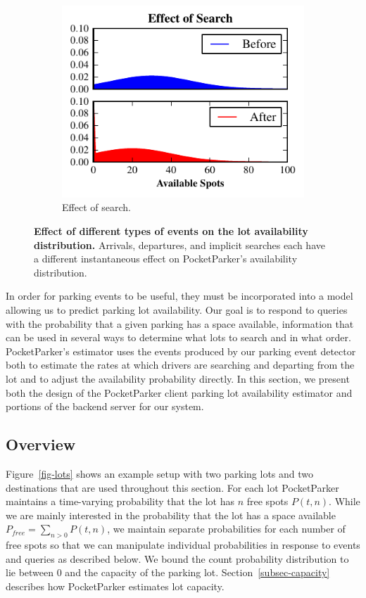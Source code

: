 \begin{figure}
\begin{subfigure}[b]{0.33\textwidth}
    \includegraphics[width=\textwidth]{./figures/search.pdf}
    \caption{Effect of search.}
    \label{fig-examples-search}
  \end{subfigure}
  \caption{\textbf{Effect of different types of events on the lot availability
  distribution.} Arrivals, departures, and implicit searches each have a
  different instantaneous effect on PocketParker's availability distribution.}
  \label{fig-examples}
\end{figure}

In order for parking events to be useful, they must be incorporated into a
model allowing us to predict parking lot availability. Our goal is to respond
to queries with the probability that a given parking has a space available,
information that can be used in several ways to determine what lots to search
and in what order. PocketParker's estimator uses the events produced by our
parking event detector both to estimate the rates at which drivers are
searching and departing from the lot and to adjust the availability
probability directly. In this section, we present both the design of the
PocketParker client parking lot availability estimator and portions of
the backend server for our system.

\subsection{Overview}

Figure~\ref{fig-lots} shows an example setup with two parking lots and two
destinations that are used throughout this section. For each lot PocketParker
maintains a time-varying probability that the lot has $n$ free spots $P(t,
n)$. While we are mainly interested in the probability that the lot has a
space available $P_{free} = \sum_{n > 0} P(t, n)$, we maintain separate
probabilities for each number of free spots so that we can manipulate
individual probabilities in response to events and queries as described
below. We bound the count probability distribution to lie between 0 and the
capacity of the parking lot. Section~\ref{subsec-capacity} describes how
PocketParker estimates lot capacity.

